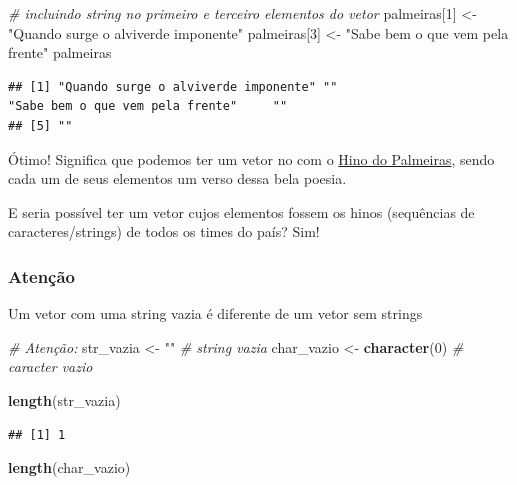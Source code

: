 \documentclass[]{book}
\newenvironment{Shaded}{\begin{snugshade}}{\end{snugshade}}
\newcommand{\CommentTok}[1]{\textcolor[rgb]{0.56,0.35,0.01}{\textit{#1}}}
\newcommand{\DecValTok}[1]{\textcolor[rgb]{0.00,0.00,0.81}{#1}}
\newcommand{\KeywordTok}[1]{\textcolor[rgb]{0.13,0.29,0.53}{\textbf{#1}}}
\newcommand{\NormalTok}[1]{#1}
\newcommand{\StringTok}[1]{\textcolor[rgb]{0.31,0.60,0.02}{#1}}
\begin{document}
\begin{Shaded}
\begin{Highlighting}[]
\CommentTok{# incluindo string no primeiro e terceiro elementos do vetor}
\NormalTok{palmeiras[}\DecValTok{1}\NormalTok{] <-}\StringTok{ "Quando surge o alviverde imponente"}
\NormalTok{palmeiras[}\DecValTok{3}\NormalTok{] <-}\StringTok{ "Sabe bem o que vem pela frente"}
\NormalTok{palmeiras}
\end{Highlighting}
\end{Shaded}

\begin{verbatim}
## [1] "Quando surge o alviverde imponente" ""                                   "Sabe bem o que vem pela frente"     ""                                  
## [5] ""
\end{verbatim}

Ótimo! Significa que podemos ter um vetor no com o \href{http://www.palmeiras.com.br/historia/hino}{Hino do Palmeiras}, sendo cada um de seus elementos um verso dessa bela poesia.

E seria possível ter um vetor cujos elementos fossem os hinos (sequências de caracteres/strings) de todos os times do país? Sim!

\hypertarget{atenuxe7uxe3o}{%
\subsubsection{Atenção}\label{atenuxe7uxe3o}}

Um vetor com uma string vazia é diferente de um vetor sem strings

\begin{Shaded}
\begin{Highlighting}[]
\CommentTok{# Atenção:}
\NormalTok{str_vazia <-}\StringTok{ ""}  \CommentTok{# string vazia}
\NormalTok{char_vazio <-}\StringTok{ }\KeywordTok{character}\NormalTok{(}\DecValTok{0}\NormalTok{)  }\CommentTok{# caracter vazio}

\KeywordTok{length}\NormalTok{(str_vazia)}
\end{Highlighting}
\end{Shaded}

\begin{verbatim}
## [1] 1
\end{verbatim}

\begin{Shaded}
\begin{Highlighting}[]
\KeywordTok{length}\NormalTok{(char_vazio)}
\end{Highlighting}
\end{Shaded}
\end{document}
